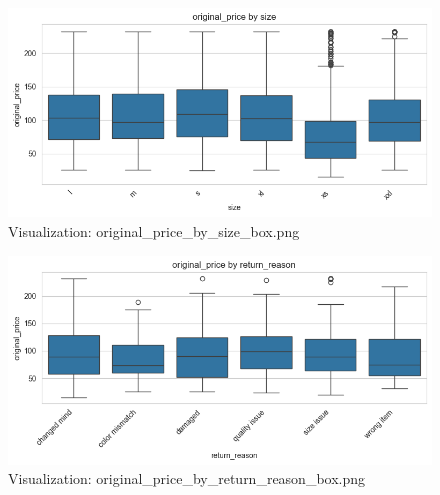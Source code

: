 \documentclass{article}%
\begin{document}
\begin{minipage}[c]{0.48\textwidth}%


\begin{figure}[H]%
\centering%
\includegraphics[width=\linewidth]{output/plots/original_price_by_size_box.png}%
\caption{Visualization: original\_price\_by\_size\_box.png}%
\end{figure}

%
\end{minipage}%
\begin{minipage}[c]{0.48\textwidth}%


\begin{figure}[H]%
\centering%
\includegraphics[width=\linewidth]{output/plots/original_price_by_return_reason_box.png}%
\caption{Visualization: original\_price\_by\_return\_reason\_box.png}%
\end{figure}

%
\end{minipage}%
\vspace{10pt}%
\\%
\end{document}
